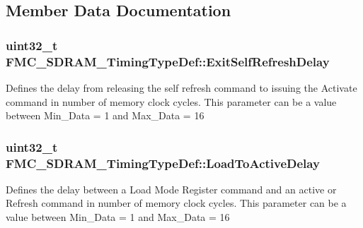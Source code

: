 \subsection{Member Data Documentation}
\subsubsection[{\texorpdfstring{Exit\+Self\+Refresh\+Delay}{ExitSelfRefreshDelay}}]{\setlength{\rightskip}{0pt plus 5cm}uint32\+\_\+t F\+M\+C\+\_\+\+S\+D\+R\+A\+M\+\_\+\+Timing\+Type\+Def\+::\+Exit\+Self\+Refresh\+Delay}\hypertarget{struct_f_m_c___s_d_r_a_m___timing_type_def_a05c3b7b4946d8fa707e5263a39baf73d}{}\label{struct_f_m_c___s_d_r_a_m___timing_type_def_a05c3b7b4946d8fa707e5263a39baf73d}
Defines the delay from releasing the self refresh command to issuing the Activate command in number of memory clock cycles. This parameter can be a value between Min\+\_\+\+Data = 1 and Max\+\_\+\+Data = 16 
\subsubsection[{\texorpdfstring{Load\+To\+Active\+Delay}{LoadToActiveDelay}}]{\setlength{\rightskip}{0pt plus 5cm}uint32\+\_\+t F\+M\+C\+\_\+\+S\+D\+R\+A\+M\+\_\+\+Timing\+Type\+Def\+::\+Load\+To\+Active\+Delay}\hypertarget{struct_f_m_c___s_d_r_a_m___timing_type_def_aa4e0baa631f3af95366dae966699f102}{}\label{struct_f_m_c___s_d_r_a_m___timing_type_def_aa4e0baa631f3af95366dae966699f102}
Defines the delay between a Load Mode Register command and an active or Refresh command in number of memory clock cycles. This parameter can be a value between Min\+\_\+\+Data = 1 and Max\+\_\+\+Data = 16 

